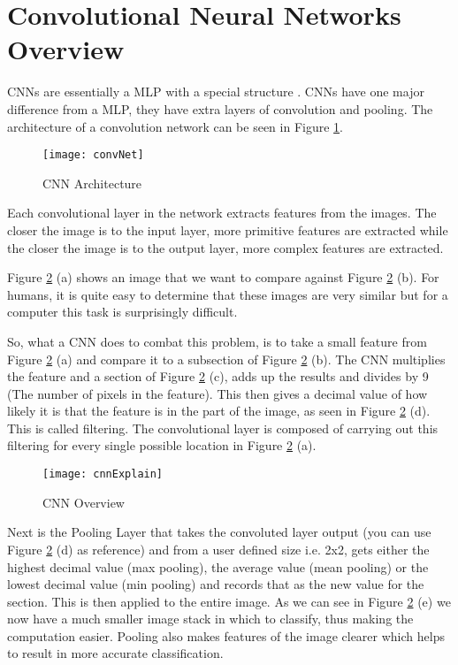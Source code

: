 \section{Convolutional Neural Networks Overview}
CNNs are essentially a MLP with a
special structure \parencite{visualizing}. CNNs have one major difference from a MLP, they have extra
layers of convolution and pooling. The architecture of a convolution network can
be seen in Figure \ref{fig:convNet}.

\begin{figure}[h]
	\texttt{[image: convNet]}
	\caption{CNN Architecture}
	\label{fig:convNet}
\end{figure}

Each convolutional layer in the network extracts features from the images.
The closer the image is to the input layer, more primitive features are extracted while
the closer the image is to the output layer, more complex features are extracted.

Figure \ref{fig:cnnExplain} (a) shows an image that we want to compare against
Figure \ref{fig:cnnExplain} (b).
For humans, it is quite easy to determine that these images are very similar but
for a computer this task is surprisingly difficult.

So, what a CNN does to combat this problem, is to take a small feature from
Figure \ref{fig:cnnExplain} (a) and compare it to a subsection of Figure \ref{fig:cnnExplain} (b).
The CNN multiplies the feature and a section of Figure \ref{fig:cnnExplain} (c), adds
up the results and divides by 9 (The number of pixels in the feature). This then gives a decimal value of how likely
it is that the feature is in the part of the image, as seen in Figure
\ref{fig:cnnExplain} (d).
This is called filtering. The convolutional layer is composed of carrying out
this filtering for every single possible location in Figure \ref{fig:cnnExplain} (a).

\begin{figure}
    \texttt{[image: cnnExplain]}
    \caption{CNN Overview}
    \label{fig:cnnExplain}
\end{figure}
Next is the Pooling Layer that takes the convoluted
layer output (you can use Figure \ref{fig:cnnExplain} (d) as reference) and from a
user defined size i.e. 2x2, gets either the highest decimal value (max pooling), the average value (mean pooling) or the lowest decimal value (min pooling) and records that as the new value for the
section. This is then applied to the entire image. As we can see in Figure
\ref{fig:cnnExplain} (e) we now have a much smaller image stack in which to classify,
thus making the computation easier. Pooling also makes features of the image clearer which helps to result in more accurate classification.

